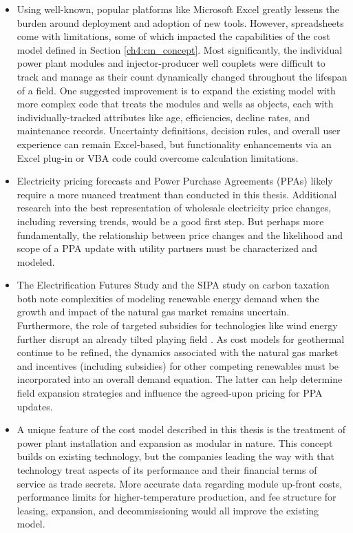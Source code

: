 \begin{itemize}
    \item Using well-known, popular platforms like Microsoft Excel greatly lessens the burden around deployment and adoption of new tools. However, spreadsheets come with limitations, some of which impacted the capabilities of the cost model defined in Section \ref{ch4:cm_concept}. Most significantly, the individual power plant modules and injector-producer well couplets were difficult to track and manage as their count dynamically changed throughout the lifespan of a field. One suggested improvement is to expand the existing model with more complex code that treats the modules and wells as objects, each with individually-tracked attributes like age, efficiencies, decline rates, and maintenance records. Uncertainty definitions, decision rules, and overall user experience can remain Excel-based, but functionality enhancements via an Excel plug-in or VBA code could overcome calculation limitations.
    \item Electricity pricing forecasts and Power Purchase Agreements (PPAs) likely require a more nuanced treatment than conducted in this thesis. Additional research into the best representation of wholesale electricity price changes, including reversing trends, would be a good first step. But perhaps more fundamentally, the relationship between price changes and the likelihood and scope of a PPA update with utility partners must be characterized and modeled.
    \item The Electrification Futures Study \citep{murphy_electrification_2021} and the SIPA study on carbon taxation \citep{larson_energy_2018} both note complexities of modeling renewable energy demand when the growth and impact of the natural gas market remains uncertain. Furthermore, the role of targeted subsidies for technologies like wind energy further disrupt an already tilted playing field \citep[see][]{lazard_lazards_2020}. As cost models for geothermal continue to be refined, the dynamics associated with the natural gas market and incentives (including subsidies) for other competing renewables must be incorporated into an overall demand equation. The latter can help determine field expansion strategies and influence the agreed-upon pricing for PPA updates.
    \item A unique feature of the cost model described in this thesis is the treatment of power plant installation and expansion as modular in nature. This concept builds on existing technology, but the companies leading the way with that technology treat aspects of its performance and their financial terms of service as trade secrets. More accurate data regarding module up-front costs, performance limits for higher-temperature production, and fee structure for leasing, expansion, and decommissioning would all improve the existing model.

\end{itemize}
